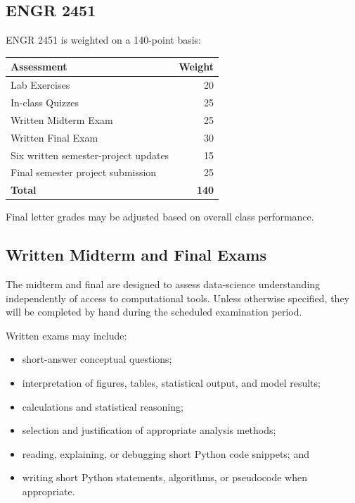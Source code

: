 \documentclass[11pt]{article}
\begin{document}
\subsection{ENGR 2451}

ENGR 2451 is weighted on a 140-point basis:

\begin{center}
\begin{tabular}{@{}lr@{}}
\toprule
\textbf{Assessment} & \textbf{Weight}\\
\midrule
Lab Exercises & 20\\
In-class Quizzes & 25\\
Written Midterm Exam & 25\\
Written Final Exam & 30\\
Six written semester-project updates & 15\\
Final semester project submission & 25\\
\midrule
\textbf{Total} & \textbf{140}\\
\bottomrule
\end{tabular}
\end{center}

Final letter grades may be adjusted based on overall class performance.

\subsection{Written Midterm and Final Exams}

The midterm and final are designed to assess data-science understanding independently of access to computational tools. Unless otherwise specified, they will be completed by hand during the scheduled examination period.

Written exams may include:

\begin{itemize}
  \item short-answer conceptual questions;
  \item interpretation of figures, tables, statistical output, and model results;
  \item calculations and statistical reasoning;
  \item selection and justification of appropriate analysis methods;
  \item reading, explaining, or debugging short Python code snippets; and
  \item writing short Python statements, algorithms, or pseudocode when appropriate.
\end{itemize}
\end{document}

